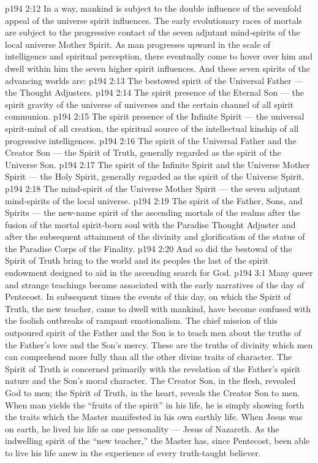 \vs p194 2:12 In a way, mankind is subject to the double influence of the sevenfold appeal of the universe spirit influences. The early evolutionary races of mortals are subject to the progressive contact of the seven adjutant mind\hyp{}spirits of the local universe Mother Spirit. As man progresses upward in the scale of intelligence and spiritual perception, there eventually come to hover over him and dwell within him the seven higher spirit influences. And these seven spirits of the advancing worlds are:
\vs p194 2:13 \bibnobreakspace The bestowed spirit of the Universal Father --- the Thought Adjusters.
\vs p194 2:14 \bibnobreakspace The spirit presence of the Eternal Son --- the spirit gravity of the universe of universes and the certain channel of all spirit communion.
\vs p194 2:15 \bibnobreakspace The spirit presence of the Infinite Spirit --- the universal spirit\hyp{}mind of all creation, the spiritual source of the intellectual kinship of all progressive intelligences.
\vs p194 2:16 \bibnobreakspace The spirit of the Universal Father and the Creator Son --- the Spirit of Truth, generally regarded as the spirit of the Universe Son.
\vs p194 2:17 \bibnobreakspace The spirit of the Infinite Spirit and the Universe Mother Spirit --- the Holy Spirit, generally regarded as the spirit of the Universe Spirit.
\vs p194 2:18 \bibnobreakspace The mind\hyp{}spirit of the Universe Mother Spirit --- the seven adjutant mind\hyp{}spirits of the local universe.
\vs p194 2:19 \bibnobreakspace The spirit of the Father, Sons, and Spirits --- the new\hyp{}name spirit of the ascending mortals of the realms after the fusion of the mortal spirit\hyp{}born soul with the Paradise Thought Adjuster and after the subsequent attainment of the divinity and glorification of the status of the Paradise Corps of the Finality.
\vs p194 2:20 \pc And so did the bestowal of the Spirit of Truth bring to the world and its peoples the last of the spirit endowment designed to aid in the ascending search for God.
\vs p194 3:1 Many queer and strange teachings became associated with the early narratives of the day of Pentecost. In subsequent times the events of this day, on which the Spirit of Truth, the new teacher, came to dwell with mankind, have become confused with the foolish outbreaks of rampant emotionalism. The chief mission of this outpoured spirit of the Father and the Son is to teach men about the truths of the Father’s love and the Son’s mercy. These are the truths of divinity which men can comprehend more fully than all the other divine traits of character. The Spirit of Truth is concerned primarily with the revelation of the Father’s spirit nature and the Son’s moral character. The Creator Son, in the flesh, revealed God to men; the Spirit of Truth, in the heart, reveals the Creator Son to men. When man yields the “fruits of the spirit” in his life, he is simply showing forth the traits which the Master manifested in his own earthly life. When Jesus was on earth, he lived his life as one personality --- Jesus of Nazareth. As the indwelling spirit of the “new teacher,” the Master has, since Pentecost, been able to live his life anew in the experience of every truth\hyp{}taught believer.
